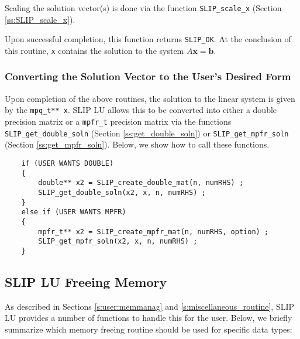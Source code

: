 \documentclass[12pt]{article}
\theoremstyle{definition}
\begin{document}
Scaling the solution vector(s) is done via the function \verb|SLIP_scale_x|
(Section \ref{ss:SLIP_scale_x}).

Upon successful completion, this function returns \verb|SLIP_OK|. At the
conclusion of this routine, \verb|x| contains the solution to the system $A
\mathbf{x} = \mathbf{b}$.

\subsubsection{Converting the Solution Vector to the User's Desired Form}

Upon completion of the above routines, the solution to the linear system is
given by the \verb|mpq_t** x|. SLIP LU allows this to be converted into either
a double precision matrix or a \verb|mpfr_t| precision matrix via the functions
\verb|SLIP_get_double_soln| (Section \ref{ss:get_double_soln}) or
\verb|SLIP_get_mpfr_soln| (Section \ref{ss:get_mpfr_soln}). Below, we show how
to call these functions.

{\small
\begin{verbatim}
    if (USER WANTS DOUBLE)
    {
        double** x2 = SLIP_create_double_mat(n, numRHS) ;
        SLIP_get_double_soln(x2, x, n, numRHS) ;
    }
    else if (USER WANTS MPFR)
    {
        mpfr_t** x2 = SLIP_create_mpfr_mat(n, numRHS, option) ;
        SLIP_get_mpfr_soln(x2, x, n, numRHS) ;
    } \end{verbatim} }

\cprotect\subsection{SLIP LU Freeing Memory}
\label{s:Using:free}

As described in Sections \ref{s:user:memmanag} and
\ref{s:miscellaneous_routine}, SLIP LU provides a number of functions to handle
this for the user. Below, we briefly summarize which memory freeing routine
should be used for specific data types:
\end{document}
